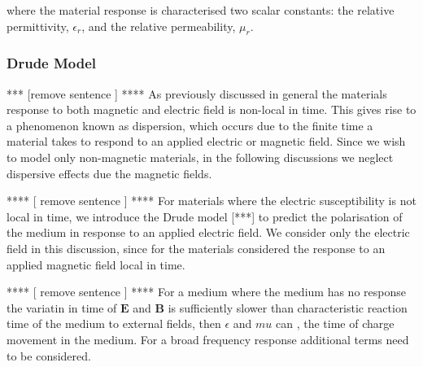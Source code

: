 where the material response is characterised two scalar constants: the relative permittivity, $\epsilon_r$, and the relative permeability, $\mu_r$.

\subsubsection{Drude Model} 
\label{sub:The Drude Model}

*** [remove sentence ] **** As previously discussed in general the materials response to both magnetic and electric field is non-local in time. This gives rise to a phenomenon known as dispersion, which occurs due to the finite time a material takes to respond to an applied electric or magnetic field. Since we wish to model only non-magnetic materials, in the following discussions we neglect dispersive effects due the magnetic fields.

**** [ remove sentence ] **** For materials where the electric susceptibility is not local in time, we introduce the Drude model [***] to predict the polarisation of the medium in response to an applied electric field. We consider only the electric field in this discussion, since for the materials considered the response to an applied magnetic field local in time.

**** [ remove sentence ] **** For a medium where the medium has no response the variatin in time of $\mathbf{E}$ and $\mathbf{B}$ is sufficiently slower than characteristic reaction time of the medium to external fields, then $\epsilon$ and $mu$ can , the time of charge movement in the medium. For a broad frequency response additional terms need to be considered.





